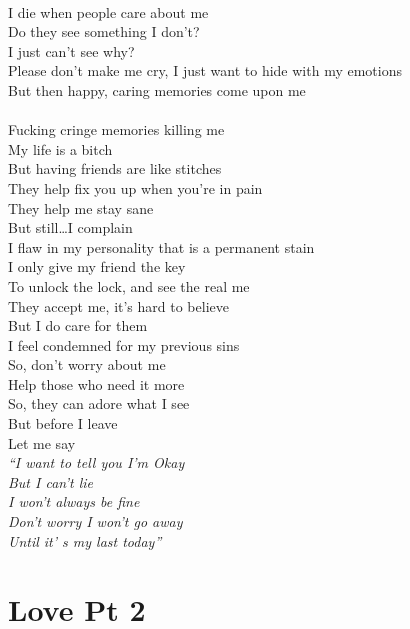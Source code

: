 \documentclass[12pt, b5paper]{article}
\begin{document}
\\I die when people care about me 
\\Do they see something I don’t? 
\\I just can’t see why? 
\\Please don’t make me cry, I just want to hide with my emotions 
\\But then happy, caring memories come upon me 
\\\\Fucking cringe memories killing me 
\\My life is a bitch 
\\But having friends are like stitches 
\\They help fix you up when you’re in pain 
\\They help me stay sane 
\\But still…I complain
\\I flaw in my personality that is a permanent stain
\\I only give my friend the key 
\\To unlock the lock, and see the real me 
\\They accept me, it’s hard to believe 
\\But I do care for them
\\I feel condemned for my previous sins 
\\So, don’t worry about me 
\\Help those who need it more 
\\So, they can adore what I see
\\But before I leave 
\\Let me say
\\\textit{“I want to tell you I’m Okay
\\But I can’t lie 
\\I won’t always be fine 
\\Don’t worry I won’t go away
\\Until it’ s my last today”}

\newpage 
\section{Love Pt 2}
\end{document}
